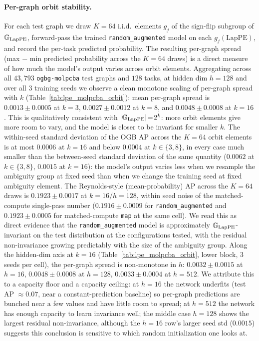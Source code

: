 \documentclass{article}
\begin{document}
\paragraph{Per-graph orbit stability.}
For each test graph we draw $K\!=\!64$ i.i.d.\ elements $g_j$ of the
sign-flip subgroup of $\mathbb{G}_{\mathrm{LapPE}}$, forward-pass the trained
\texttt{random\_augmented} model on each $g_j(\mathrm{LapPE})$, and
record the per-task predicted probability. The resulting per-graph
spread (max $-$ min predicted probability across the $K\!=\!64$ draws)
is a direct measure of how much the model's output varies across
orbit elements. Aggregating across all $43{,}793$ \texttt{ogbg-molpcba}
test graphs and $128$ tasks, at hidden dim $h\!=\!128$ and over all
$3$ training seeds we observe a clean monotone scaling of per-graph
spread with $k$ (Table~\ref{tab:lpe_molpcba_orbit}): mean per-graph
spread is $0.0013\!\pm\!0.0005$ at $k\!=\!3$, $0.0027\!\pm\!0.0012$
at $k\!=\!8$, and $0.0048\!\pm\!0.0008$ at $k\!=\!16$. This is
qualitatively consistent with $|\mathbb{G}_{\mathrm{LapPE}}|\!=\!2^{k}$:
more orbit elements give more room to vary, and the model is closer
to be invariant for smaller $k$. The within-seed standard deviation of
the OGB AP across the $K\!=\!64$ orbit elements is at most $0.0006$
at $k\!=\!16$ and below $0.0004$ at $k\!\in\!\{3,8\}$, in every case
much smaller than the between-seed standard deviation of the same
quantity ($0.0062$ at $k\!\in\!\{3,8\}$, $0.0015$ at $k\!=\!16$):
the model's output varies less when we resample the ambiguity group
at fixed seed than when we change the training seed at fixed
ambiguity element. The Reynolds-style (mean-probability) AP across
the $K\!=\!64$ draws is $0.1923\!\pm\!0.0017$ at
$k\!=\!16$/$h\!=\!128$, within seed noise of the matched-compute
single-pass number ($0.1916\!\pm\!0.0009$ for
\texttt{random\_augmented} and $0.1923\!\pm\!0.0005$ for
matched-compute \texttt{map} at the same cell). We read this as
direct evidence that the \texttt{random\_augmented} model is
approximately $\mathbb{G}_{\mathrm{LapPE}}$-invariant on the test
distribution at the configurations tested, with the residual
non-invariance growing predictably with the size of the ambiguity
group. Along the hidden-dim axis at $k\!=\!16$
(Table~\ref{tab:lpe_molpcba_orbit}, lower block, $3$ seeds per cell),
the per-graph spread is non-monotone in $h$:
$0.0032\!\pm\!0.0015$ at $h\!=\!16$,
$0.0048\!\pm\!0.0008$ at $h\!=\!128$,
$0.0033\!\pm\!0.0004$ at $h\!=\!512$. We attribute this to a
capacity floor and a capacity ceiling: at $h\!=\!16$ the network
underfits (test AP $\approx\!0.07$, near a constant-prediction
baseline) so per-graph predictions are bunched near a few values
and have little room to spread; at $h\!=\!512$ the network has
enough capacity to learn invariance well; the middle case
$h\!=\!128$ shows the largest residual non-invariance, although the
$h\!=\!16$ row's larger seed std ($0.0015$) suggests this conclusion
is sensitive to which random initialization one looks at.
\end{document}
